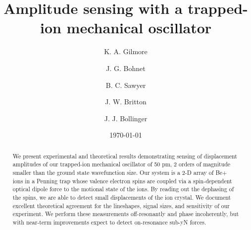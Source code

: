 \documentclass[aps,prl,twocolumn,superscriptaddress,floatfix]{revtex4-1}
\begin{document}

\title{Amplitude sensing with a trapped-ion mechanical oscillator}


\author{K. A. Gilmore}

\author{J. G. Bohnet}

\author{B. C. Sawyer}

\author{J. W. Britton}

\author{J. J. Bollinger}


\date{\today}

\begin{abstract}
We present experimental and theoretical results demonstrating sensing of displacement amplitudes of our trapped-ion mechanical oscillator of 50 pm, 2 orders of magnitude smaller than the ground state wavefunction size. Our system is a 2-D array of Be+ ions in a Penning trap whose valence electron spins are coupled via a spin-dependent optical dipole force to the motional state of the ions. By reading out the dephasing of the spins, we are able to detect small displacements of the ion crystal. We document excellent theoretical agreement for the lineshapes, signal sizes, and sensitivity of our experiment. We perform these measurements off-resonantly and phase incoherently, but with near-term improvements expect to detect on-resonance sub-yN forces.
\end{abstract}
\end{document}
